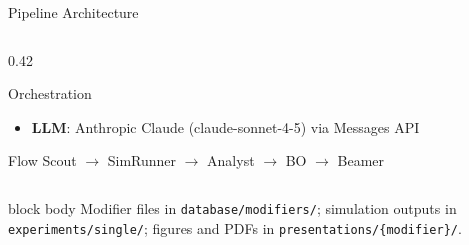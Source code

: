 \documentclass[8pt,aspectratio=169]{beamer}
\begin{document}
\begin{frame}{Pipeline Architecture}
\begin{columns}[T]
\begin{column}{0.42\textwidth}
\begin{block}{Orchestration}
\begin{itemize}
                on PHREEQC error (max 3)
          \item \textbf{LLM}: Anthropic Claude (claude-sonnet-4-5)
                via Messages API
        \end{itemize}
      \end{block}
      \vspace{4pt}
      \begin{block}{Flow}
        \centering
        \small
        Scout $\to$ SimRunner $\to$ Analyst $\to$ BO $\to$ Beamer
      \end{block}
    \end{column}
  \end{columns}
  \vspace{4pt}
  \begin{beamercolorbox}[rounded=true, shadow=false, wd=\textwidth]{block body}
    \tiny
    Modifier files in \texttt{database/modifiers/}; simulation outputs in \texttt{experiments/single/}; figures and PDFs in \texttt{presentations/\{modifier\}/}.
  \end{beamercolorbox}
\end{frame}
\end{document}
